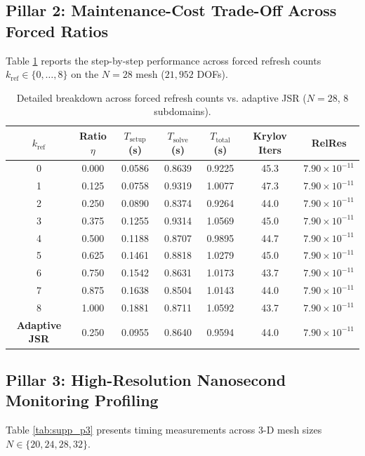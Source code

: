 \documentclass[11pt,a4paper]{article}
\begin{document}
\subsection{Pillar 2: Maintenance-Cost Trade-Off Across Forced Ratios}
Table \ref{tab:supp_p2} reports the step-by-step performance across forced refresh counts $k_{\text{ref}} \in \{0, \dots, 8\}$ on the $N=28$ mesh ($21,952$ DOFs).

\begin{table}[htbp]
\centering
\small
\caption{Detailed breakdown across forced refresh counts vs. adaptive JSR ($N=28$, 8 subdomains).}
\label{tab:supp_p2}
\begin{tabular}{ccccccc}
\toprule
$k_{\text{ref}}$ & Ratio $\eta$ & $T_{\text{setup}}$ (s) & $T_{\text{solve}}$ (s) & $T_{\text{total}}$ (s) & Krylov Iters & RelRes \\
\midrule
0 & 0.000 & 0.0586 & 0.8639 & 0.9225 & 45.3 & $7.90 \times 10^{-11}$ \\
1 & 0.125 & 0.0758 & 0.9319 & 1.0077 & 47.3 & $7.90 \times 10^{-11}$ \\
2 & 0.250 & 0.0890 & 0.8374 & 0.9264 & 44.0 & $7.90 \times 10^{-11}$ \\
3 & 0.375 & 0.1255 & 0.9314 & 1.0569 & 45.0 & $7.90 \times 10^{-11}$ \\
4 & 0.500 & 0.1188 & 0.8707 & 0.9895 & 44.7 & $7.90 \times 10^{-11}$ \\
5 & 0.625 & 0.1461 & 0.8818 & 1.0279 & 45.0 & $7.90 \times 10^{-11}$ \\
6 & 0.750 & 0.1542 & 0.8631 & 1.0173 & 43.7 & $7.90 \times 10^{-11}$ \\
7 & 0.875 & 0.1638 & 0.8504 & 1.0143 & 44.0 & $7.90 \times 10^{-11}$ \\
8 & 1.000 & 0.1881 & 0.8711 & 1.0592 & 43.7 & $7.90 \times 10^{-11}$ \\
\midrule
\textbf{Adaptive JSR} & 0.250 & 0.0955 & 0.8640 & 0.9594 & 44.0 & $7.90 \times 10^{-11}$ \\
\bottomrule
\end{tabular}
\end{table}

\subsection{Pillar 3: High-Resolution Nanosecond Monitoring Profiling}
Table \ref{tab:supp_p3} presents timing measurements across 3-D mesh sizes $N \in \{20, 24, 28, 32\}$.
\end{document}
